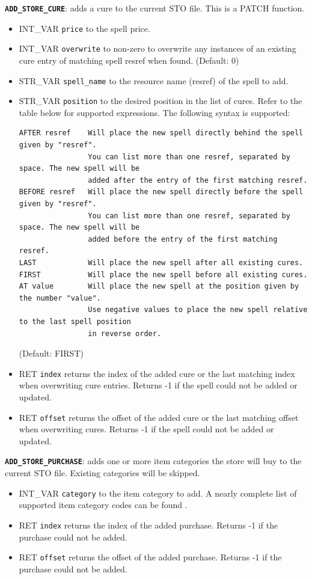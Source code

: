 \documentclass{article}
\def\DEFINE#1{{\tt \bf #1}\label{#1}\index{#1}}
\begin{document}
\DEFINE{\verb+ADD_STORE_CURE+}: adds a cure to the current STO file. This is a PATCH function.

\begin{itemize}
\item INT_VAR \verb+price+ to the spell price.
\item INT_VAR \verb+overwrite+ to non-zero to overwrite any instances of an existing cure entry of matching spell resref when found. (Default: 0)
\item STR_VAR \verb+spell_name+ to the resource name (resref) of the spell to add.
\item STR_VAR \verb+position+ to the desired position in the list of cures. Refer to the table below for supported expressions. The following syntax is supported:
\begin{verbatim}
AFTER resref    Will place the new spell directly behind the spell given by "resref".
                You can list more than one resref, separated by space. The new spell will be
                added after the entry of the first matching resref.
BEFORE resref   Will place the new spell directly before the spell given by "resref".
                You can list more than one resref, separated by space. The new spell will be
                added before the entry of the first matching resref.
LAST            Will place the new spell after all existing cures.
FIRST           Will place the new spell before all existing cures.
AT value        Will place the new spell at the position given by the number "value".
                Use negative values to place the new spell relative to the last spell position
                in reverse order.
\end{verbatim}
(Default: FIRST)
\item RET \verb+index+ returns the index of the added cure or the last matching index when overwriting cure entries. Returns -1 if the spell could not be added or updated.
\item RET \verb+offset+ returns the offset of the added cure or the last matching offset when overwriting cures. Returns -1 if the spell could not be added or updated.
\end{itemize}

\DEFINE{\verb+ADD_STORE_PURCHASE+}: adds one or more item categories the store will buy to the current STO file. Existing categories will be skipped.
\begin{itemize}
\item INT_VAR \verb+category+ to the item category to add. A nearly complete list of supported item category codes can be found .
\item RET \verb+index+ returns the index of the added purchase. Returns -1 if the purchase could not be added.
\item RET \verb+offset+ returns the offset of the added purchase. Returns -1 if the purchase could not be added.
\end{itemize}
\end{document}
